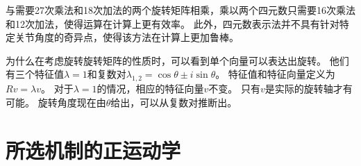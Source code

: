 
与需要27次乘法和18次加法的两个旋转矩阵相乘，乘以两个四元数只需要16次乘法和12次加法，使得运算在计算上更有效率。 此外，四元数表示法并不具有针对特定关节角度的奇异点，使得该方法在计算上更加鲁棒。


为什么在考虑旋转旋转矩阵的性质时，可以看到单个向量可以表达出旋转。 他们有三个特征值$ \lambda = 1 $和复数对$ \lambda_ {1,2} = \cos \theta \pm i \sin \theta $。 特征值和特征向量定义为$ Rv = \lambda v $。 对于$ \lambda = 1 $的情况，相应的特征向量$ v $不变。 只有$ v $是实际的旋转轴才有可能。 旋转角度现在由$ \theta $给出，可以从复数对推断出。

\section{所选机制的正运动学}



